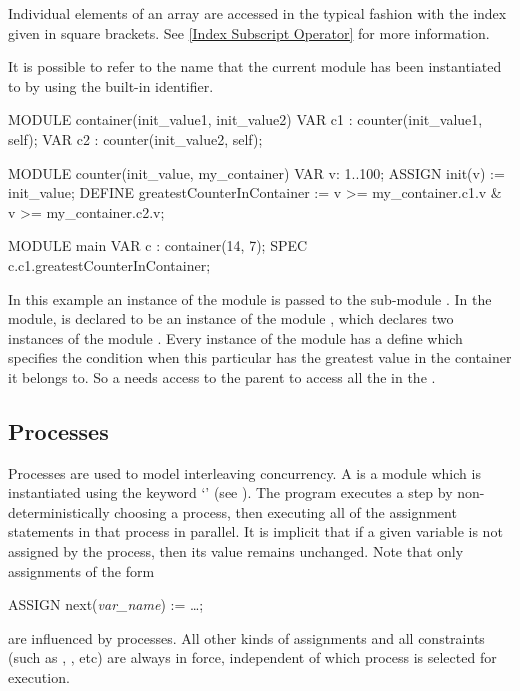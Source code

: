 Individual elements of an array are accessed in the typical fashion
with the index given in square brackets. See \ref{Index Subscript
Operator} for more information.


It is possible to refer to the name that the current module has been
instantiated to by using the  built-in
identifier.
%
\begin{nusmvCode}
MODULE container(init_value1, init_value2)
  VAR c1 : counter(init_value1, self);
  VAR c2 : counter(init_value2, self);

MODULE counter(init_value, my_container)
  VAR v: 1..100;
  ASSIGN
     init(v) := init_value;
  DEFINE
     greatestCounterInContainer := v >= my_container.c1.v &
                                   v >= my_container.c2.v;

MODULE main
  VAR c : container(14, 7);
  SPEC
    c.c1.greatestCounterInContainer;
\end{nusmvCode}
%
In this example an instance of the module  is passed
to the sub-module .
%
In the  module,  is declared to be an instance of
the module , which declares two instances of the module
.
%
Every instance of the  module has a define
 which specifies the condition when
this particular  has the greatest value in the container
it belongs to.
%
So a  needs access to the parent  to
access all the  in the .


\subsection{Processes}
\label{Processes}
%
%
%
\vspace{3mm}

Processes are used to model interleaving
concurrency. A  is a module which is instantiated
using the keyword `' (see ).
%
The program executes a step by non-deterministically choosing a
process, then executing all of the assignment statements in that
process in parallel.
%
It is implicit that if a given variable is not assigned by the
process, then its value remains unchanged.
%
Note that only assignments of the form
%
\begin{nusmvCode}
ASSIGN next(\emph{var_name}) := \ldots ;
\end{nusmvCode}
%
are influenced by processes. All other kinds of assignments and
all constraints (such as , , etc) are always in
force, independent of which process is selected for execution.

